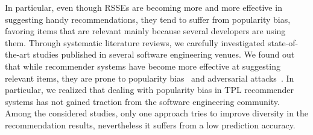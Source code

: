 In particular, even though RSSEs are becoming more and more effective in suggesting handy recommendations, they tend to suffer from popularity bias, \ie favoring items that are relevant mainly because several developers are using them. %
Through systematic literature reviews, we carefully investigated state-of-the-art studies published in several software engineering venues. We found out that while recommender systems have become more effective at suggesting relevant items, they are prone to popularity bias~\cite{10174041} and adversarial attacks~\cite{10.1145/3463274.3463809,9678946}. %
In particular, we realized that dealing with popularity bias in TPL recommender systems has not gained traction from the software engineering community. Among the considered studies, only one approach tries to improve diversity in the recommendation results, nevertheless it suffers from a low prediction accuracy. %
